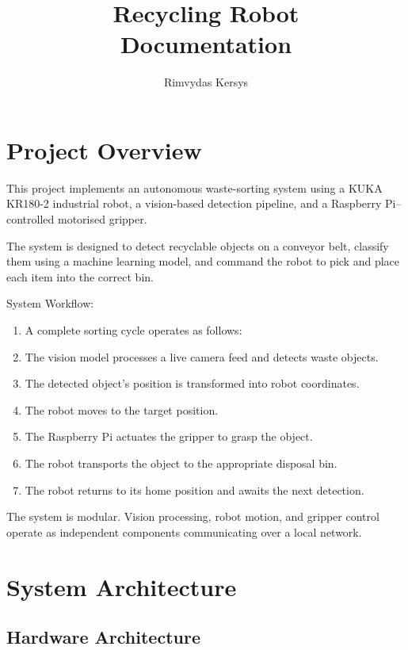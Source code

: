 \documentclass{ol-softwaremanual}
\title{Recycling Robot\\Documentation}
\author{Rimvydas Kersys}
\begin{document}
\maketitle

\tableofcontents
\listoflistings
\newpage

\section{Project Overview}

This project implements an autonomous waste-sorting system using a KUKA KR180-2 industrial robot, a vision-based detection pipeline, and a Raspberry Pi–controlled motorised gripper.

The system is designed to detect recyclable objects on a conveyor belt, classify them using a machine learning model, and command the robot to pick and place each item into the correct bin.

System Workflow:
\begin{enumerate}
    \item A complete sorting cycle operates as follows:
    \item The vision model processes a live camera feed and detects waste objects.
    \item The detected object’s position is transformed into robot coordinates.
    \item The robot moves to the target position.
    \item The Raspberry Pi actuates the gripper to grasp the object.
    \item The robot transports the object to the appropriate disposal bin.
    \item The robot returns to its home position and awaits the next detection.
\end{enumerate}

The system is modular. Vision processing, robot motion, and gripper control operate as independent components communicating over a local network.

\section{System Architecture}

\newpage
\subsection{Hardware Architecture}
\end{document}
